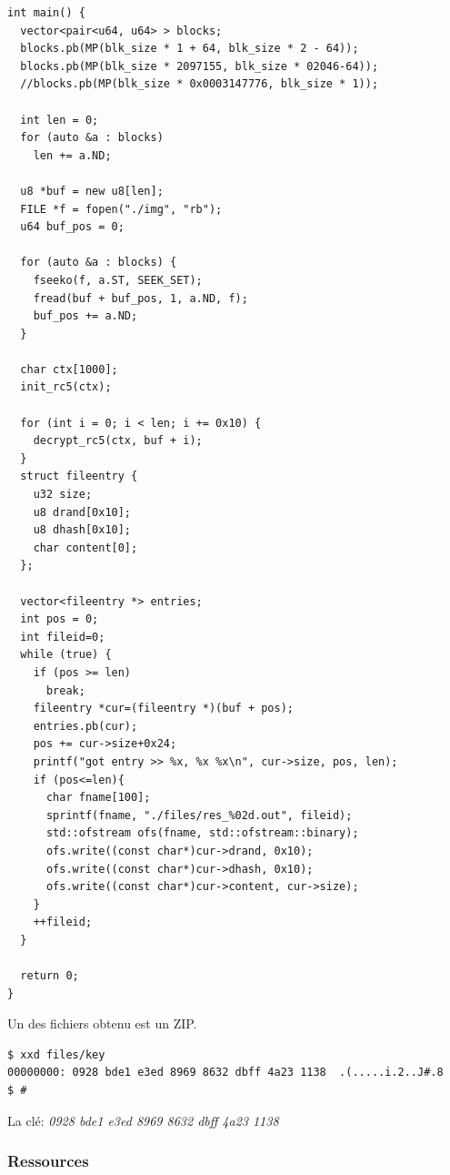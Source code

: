 \documentclass[14pt]{article}
\begin{document}
\begin{verbatim}
int main() {
  vector<pair<u64, u64> > blocks;
  blocks.pb(MP(blk_size * 1 + 64, blk_size * 2 - 64));
  blocks.pb(MP(blk_size * 2097155, blk_size * 02046-64));
  //blocks.pb(MP(blk_size * 0x0003147776, blk_size * 1));

  int len = 0;
  for (auto &a : blocks)
    len += a.ND;

  u8 *buf = new u8[len];
  FILE *f = fopen("./img", "rb");
  u64 buf_pos = 0;

  for (auto &a : blocks) {
    fseeko(f, a.ST, SEEK_SET);
    fread(buf + buf_pos, 1, a.ND, f);
    buf_pos += a.ND;
  }

  char ctx[1000];
  init_rc5(ctx);

  for (int i = 0; i < len; i += 0x10) {
    decrypt_rc5(ctx, buf + i);
  }
  struct fileentry {
    u32 size;
    u8 drand[0x10];
    u8 dhash[0x10];
    char content[0];
  };

  vector<fileentry *> entries;
  int pos = 0;
  int fileid=0;
  while (true) {
    if (pos >= len)
      break;
    fileentry *cur=(fileentry *)(buf + pos);
    entries.pb(cur);
    pos += cur->size+0x24;
    printf("got entry >> %x, %x %x\n", cur->size, pos, len);
    if (pos<=len){
      char fname[100];
      sprintf(fname, "./files/res_%02d.out", fileid);
      std::ofstream ofs(fname, std::ofstream::binary);
      ofs.write((const char*)cur->drand, 0x10);
      ofs.write((const char*)cur->dhash, 0x10);
      ofs.write((const char*)cur->content, cur->size);
    }
    ++fileid;
  }

  return 0;
}
\end{verbatim}

Un des fichiers obtenu est un ZIP.
\begin{verbatim}
$ xxd files/key
00000000: 0928 bde1 e3ed 8969 8632 dbff 4a23 1138  .(.....i.2..J#.8
$ #
\end{verbatim}


La clé:
{\em 0928 bde1 e3ed 8969 8632 dbff 4a23 1138}



\subsubsection{Ressources} \label{usb_resources}
\end{document}
